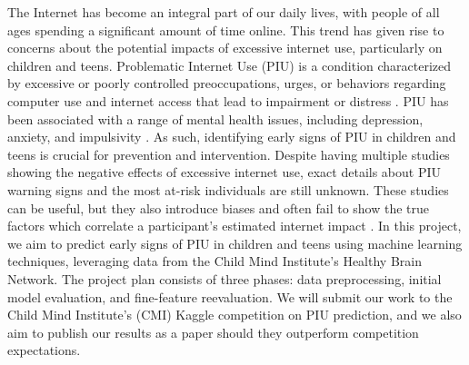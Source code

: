 \documentclass[12pt]{extarticle}
\begin{document}
    The Internet has become an integral part of our daily lives, with people of all ages spending a significant amount of time online. 
    This trend has given rise to concerns about the potential impacts of excessive internet use, particularly on children and teens.
    Problematic Internet Use (PIU) is a condition characterized by excessive or poorly controlled preoccupations, urges, or behaviors regarding computer use and internet access that lead to impairment or distress \cite{Pettorruso2020-qt}. 
    PIU has been associated with a range of mental health issues, including depression, anxiety, and impulsivity \cite{Cash2012-rb}.
    As such, identifying early signs of PIU in children and teens is crucial for prevention and intervention.
    Despite having multiple studies showing the negative effects of excessive internet use, exact details about PIU warning signs and the most at-risk individuals are still unknown.
    These studies can be useful, but they also introduce biases and often fail to show the true factors which correlate a participant's estimated internet impact \cite{Restrepo2020-pb,Aboujaoude2010-mc}.
    In this project, we aim to predict early signs of PIU in children and teens using machine learning techniques, leveraging data from the Child Mind Institute's Healthy Brain Network.
    The project plan consists of three phases: data preprocessing, initial model evaluation, and fine-feature reevaluation.
    We will submit our work to the Child Mind Institute's (CMI) Kaggle competition on PIU prediction, and we also aim to publish our results as a paper should they outperform competition expectations.



\end{document}
